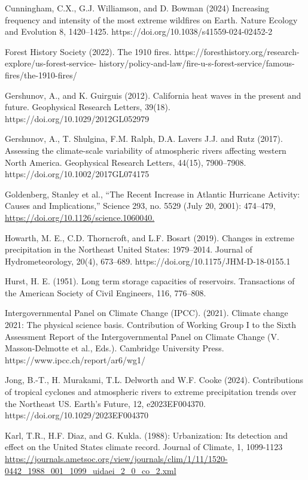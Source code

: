 \documentclass[12pt,paper=a4,DIV=12,parskip=never,chapterprefix=false,headings=standardclasses]{scrreprt}
\begin{document}
Cunningham, C.X., G.J. Williamson, and D. Bowman (2024) Increasing frequency and intensity of the
most extreme wildfires on Earth. Nature Ecology and Evolution 8, 1420–1425.
https://doi.org/10.1038/s41559-024-02452-2

Forest History Society (2022). The 1910 fires. https://foresthistory.org/research-explore/us-forest-service-
history/policy-and-law/fire-u-s-forest-service/famous-fires/the-1910-fires/

Gershunov, A., and K. Guirguis (2012). California heat waves in the present and future. Geophysical
Research Letters, 39(18). https://doi.org/10.1029/2012GL052979

Gershunov, A., T. Shulgina, F.M. Ralph, D.A. Lavers J.J. and Rutz (2017). Assessing the climate-scale
variability of atmospheric rivers affecting western North America. Geophysical Research Letters,
44(15), 7900–7908. https://doi.org/10.1002/2017GL074175

Goldenberg, Stanley et al., “The Recent Increase in Atlantic Hurricane Activity: Causes and
Implications,” Science 293, no. 5529 (July 20, 2001): 474–479,
\url{https://doi.org/10.1126/science.1060040.}

Howarth, M. E., C.D. Thorncroft, and L.F. Bosart (2019). Changes in extreme precipitation in the
Northeast United States: 1979–2014. Journal of Hydrometeorology, 20(4), 673–689.
https://doi.org/10.1175/JHM-D-18-0155.1

Hurst, H. E. (1951). Long term storage capacities of reservoirs. Transactions of the American Society of
Civil Engineers, 116, 776–808.

Intergovernmental Panel on Climate Change (IPCC). (2021). Climate change 2021: The physical science
basis. Contribution of Working Group I to the Sixth Assessment Report of the Intergovernmental
Panel on Climate Change (V. Masson-Delmotte et al., Eds.). Cambridge University Press.
https://www.ipcc.ch/report/ar6/wg1/

Jong, B.-T., H. Murakami, T.L. Delworth and W.F. Cooke (2024). Contributions of tropical cyclones and
atmospheric rivers to extreme precipitation trends over the Northeast US. Earth’s Future, 12,
e2023EF004370. https://doi.org/10.1029/2023EF004370

Karl, T.R., H.F. Diaz, and G. Kukla. (1988): Urbanization: Its detection and effect on the United States
climate record. Journal of Climate, 1, 1099-1123
\url{https://journals.ametsoc.org/view/journals/clim/1/11/1520-
0442_1988_001_1099_uidaei_2_0_co_2.xml}
\end{document}
